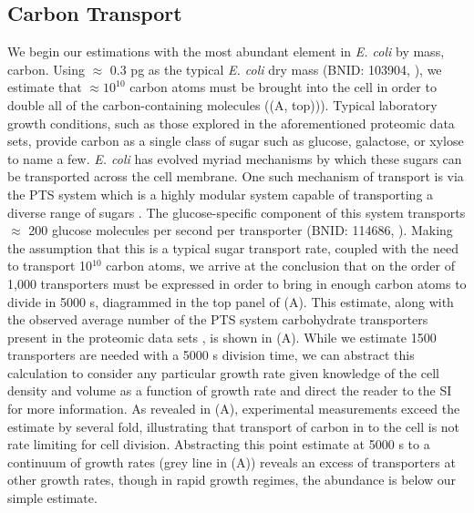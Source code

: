 \subsection{Carbon Transport}
We begin our estimations with the most abundant element in \textit{E. coli}
by mass, carbon. Using $\approx$ 0.3 pg as the typical \textit{E. coli} dry
mass (BNID: 103904, \cite{milo2010}), we estimate that $\approx 10^{10}$
carbon atoms must be brought into the cell in order to double all of the
carbon-containing molecules ((A, top))). Typical laboratory
growth conditions, such as those explored in the aforementioned proteomic
data sets, provide carbon as a single class of sugar such as glucose,
galactose, or xylose to name a few. \textit{E. coli} has evolved myriad
mechanisms by which these sugars can be transported across the cell membrane.
One such mechanism of transport is via the PTS system which is a highly
modular system capable of transporting a diverse range of sugars
\citep{escalante2012}. The glucose-specific component of this system
transports $\approx$ 200 glucose molecules per second per transporter (BNID:
114686, \cite{milo2010}). Making the assumption that this is a typical sugar
transport rate, coupled with the need to transport 10$^{10}$ carbon atoms, we
arrive at the conclusion that on the order of 1,000 transporters must be
expressed in order to bring in enough carbon atoms to divide in 5000 s,
diagrammed in the top panel of (A). This estimate, along
with the observed average number of the PTS system carbohydrate transporters present in the
proteomic data sets \citep{schmidt2016, peebo2015,valgepea2013,li2014}, is
shown in (A). While we estimate 1500 transporters are
needed with a 5000 s division time, we can abstract this calculation to consider
any particular growth rate given knowledge of the cell density and volume as a
function of growth rate and direct the reader to the SI for more information. As
revealed in (A), experimental measurements exceed the estimate
by several fold, illustrating that transport of carbon in to the cell is not
rate limiting for cell division. Abstracting this point estimate at 5000 s to a
continuum of growth rates (grey line in (A)) reveals an excess
of transporters at other growth rates, though in rapid growth regimes, the
abundance is below our simple estimate.
